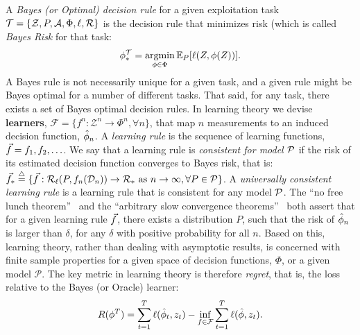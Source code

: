 \documentclass{article}
\begin{document}
\noindent  A \emph{Bayes (or Optimal) decision rule} for a given exploitation task $\mathcal{T}=\{\mathcal{Z}, P, \mathcal{A}, \Phi, \ell, \mathcal{R}\}$ is the decision rule that minimizes risk (which is called \emph{Bayes Risk} for that task: 
\begin{align}
    \phi_*^\mathcal{T} = \argmin_{\phi \in \Phi} \EE_P [\ell(Z, \phi(Z))].
\end{align}
A Bayes rule is not necessarily unique for a given task, and a given rule might be Bayes optimal for a number of different tasks.  That said, for any task, there exists a set of Bayes optimal decision rules.  In learning theory we devise  \textbf{learners}, $\mathcal{F} = \{f^n : \mathcal{Z}^n \to \Phi^n, \forall n\}$, that map $n$ measurements to an induced decision function, $\hat{\phi}_n$. 
A \emph{learning rule} is the sequence of learning functions, $\vec{f}= f_1,f_2,\ldots$.  We say that a learning rule is \emph{consistent for model $\mathcal{P}$} if the risk of its estimated decision function converges to Bayes risk, that is:
$\vec{f}_* \overset{\triangle}{=} \{ \vec{f} : \mathcal{R}_\ell(P,f_n(\mathcal{D}_n)) \to \mathcal{R}_* \text{ as } n \rightarrow \infty, \forall P \in \mathcal{P} \}$.
A \emph{universally consistent learning rule} is a learning rule that is consistent for any model $\mathcal{P}$. 
%
The ``no free lunch theorem''~\cite{Wolpert1996} and the ``arbitrary slow convergence theorems''~\cite{Devroye1993} both assert that for a given learning rule $\vec{f}$, there exists a distribution $P$, such that the risk of $\hat{\phi}_n$ is larger than $\delta$, for any $\delta$ with positive probability for all $n$.   Based on this,   learning theory, rather than dealing with asymptotic results, is concerned with finite sample properties for a given space of decision functions, $\Phi$, or a given model $\mathcal{P}$. 
The key metric in  learning theory is therefore \emph{regret}, that is, the loss relative to the Bayes (or Oracle) learner:
\begin{align}
    R(\phi^T) = \sum_{t=1}^T \ell(\hat{\phi}_t, z_t) - \inf_{f \in \mathcal{F}} \sum_{t=1}^T \ell ( \hat{\phi}, z_t).
\end{align}
\end{document}
